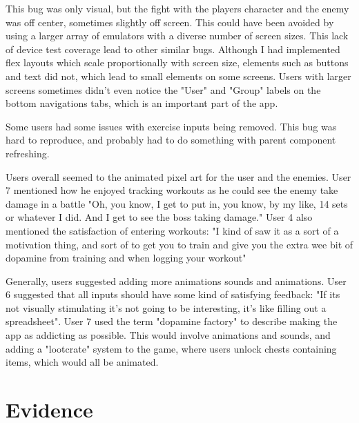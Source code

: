 \documentclass{l4proj}
\begin{document}
This bug was only visual, but the fight with the players character and the enemy was off center, sometimes slightly off screen. This could have been avoided by using a larger array of emulators with a diverse number of screen sizes. This lack of device test coverage lead to other similar bugs. Although I had implemented flex layouts which scale proportionally with screen size, elements such as buttons and text did not, which lead to small elements on some screens. Users with larger screens sometimes didn't even notice the "User" and "Group" labels on the bottom navigations tabs, which is an important part of the app.

Some users had some issues with exercise inputs being removed. This bug was hard to reproduce, and probably had to do something with parent component refreshing. 

Users overall seemed to the animated pixel art for the user and the enemies. User 7 mentioned how he enjoyed tracking workouts as he could see the enemy take damage in a battle "Oh, you know, I get to put in, you know, by my like, 14 sets or whatever I did. And I get to see the boss taking damage." User 4 also mentioned the satisfaction of entering workouts: "I kind of saw it as a sort of a motivation thing, and sort of to get you to train and give you the extra wee bit of dopamine from training and when logging your workout"

Generally, users suggested adding more animations sounds and animations.  User 6 suggested that all inputs should have some kind of satisfying feedback: "If its not visually stimulating it's not going to be interesting, it's like filling out a spreadsheet". User 7 used the term "dopamine factory" to  describe making the app as addicting as possible. This would involve animations and sounds, and adding a "lootcrate" system to the game, where users unlock chests containing items, which would all be animated. 


\section{Evidence}
\end{document}
